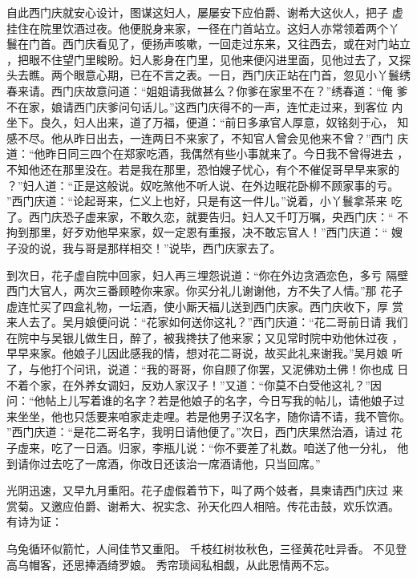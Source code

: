 自此西门庆就安心设计，图谋这妇人，屡屡安下应伯爵、谢希大这伙人，把子
虚挂住在院里饮酒过夜。他便脱身来家，一径在门首站立。这妇人亦常领着两个丫
鬟在门首。西门庆看见了，便扬声咳嗽，一回走过东来，又往西去，或在对门站立
，把眼不住望门里睃盼。妇人影身在门里，见他来便闪进里面，见他过去了，又探
头去瞧。两个眼意心期，已在不言之表。一日，西门庆正站在门首，忽见小丫鬟绣
春来请。西门庆故意问道：“姐姐请我做甚么？你爹在家里不在？”绣春道：“俺
爹不在家，娘请西门庆爹问句话儿。”这西门庆得不的一声，连忙走过来，到客位
内坐下。良久，妇人出来，道了万福，便道：“前日多承官人厚意，奴铭刻于心，
知感不尽。他从昨日出去，一连两日不来家了，不知官人曾会见他来不曾？”西门
庆道：“他昨日同三四个在郑家吃酒，我偶然有些小事就来了。今日我不曾得进去
，不知他还在那里没在。若是我在那里，恐怕嫂子忧心，有个不催促哥早早来家的
？”妇人道：“正是这般说。奴吃煞他不听人说、在外边眠花卧柳不顾家事的亏。
”西门庆道：“论起哥来，仁义上也好，只是有这一件儿。”说着，小丫鬟拿茶来
吃了。西门庆恐子虚来家，不敢久恋，就要告归。妇人又千叮万嘱，央西门庆：“
不拘到那里，好歹劝他早来家，奴一定恩有重报，决不敢忘官人！”西门庆道：“
嫂子没的说，我与哥是那样相交！”说毕，西门庆家去了。

到次日，花子虚自院中回家，妇人再三埋怨说道：“你在外边贪酒恋色，多亏
隔壁西门大官人，两次三番顾睦你来家。你买分礼儿谢谢他，方不失了人情。”那
花子虚连忙买了四盒礼物，一坛酒，使小厮天福儿送到西门庆家。西门庆收下，厚
赏来人去了。吴月娘便问说：“花家如何送你这礼？”西门庆道：“花二哥前日请
我们在院中与吴银儿做生日，醉了，被我搀扶了他来家；又见常时院中劝他休过夜
，早早来家。他娘子儿因此感我的情，想对花二哥说，故买此礼来谢我。”吴月娘
听了，与他打个问讯，说道：“我的哥哥，你自顾了你罢，又泥佛劝土佛！你也成
日不着个家，在外养女调妇，反劝人家汉子！”又道：“你莫不白受他这礼？”因
问：“他帖上儿写着谁的名字？若是他娘子的名字，今日写我的帖儿，请他娘子过
来坐坐，他也只恁要来咱家走走哩。若是他男子汉名字，随你请不请，我不管你。
”西门庆道：“是花二哥名字，我明日请他便了。”次日，西门庆果然治酒，请过
花子虚来，吃了一日酒。归家，李瓶儿说：“你不要差了礼数。咱送了他一分礼，
他到请你过去吃了一席酒，你改日还该治一席酒请他，只当回席。”

光阴迅速，又早九月重阳。花子虚假着节下，叫了两个妓者，具柬请西门庆过
来赏菊。又邀应伯爵、谢希大、祝实念、孙天化四人相陪。传花击鼓，欢乐饮酒。
有诗为证：

乌兔循环似箭忙，人间佳节又重阳。
千枝红树妆秋色，三径黄花吐异香。
不见登高乌帽客，还思捧酒绮罗娘。
秀帘琐闼私相觑，从此恩情两不忘。

